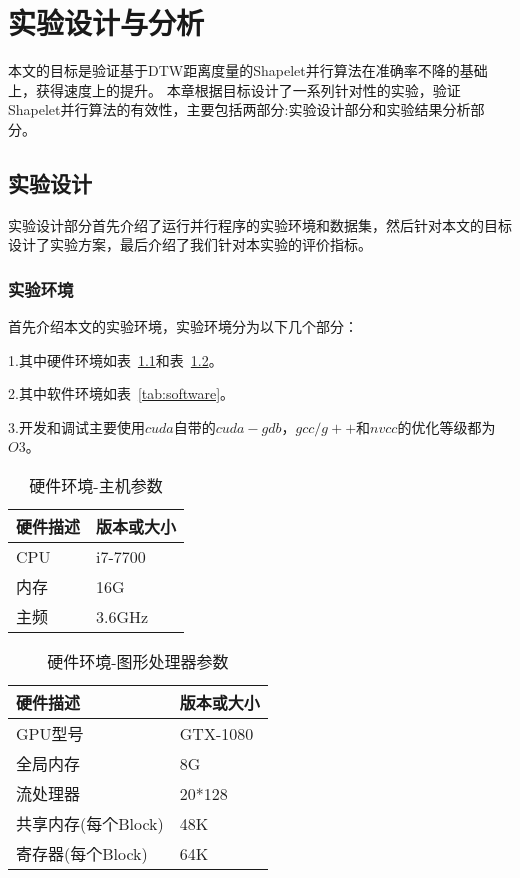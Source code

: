 \chapter{实验设计与分析}
\label{cha:expriment}

本文的目标是验证基于DTW距离度量的Shapelet并行算法在准确率不降的基础上，获得速度上的提升。
本章根据目标设计了一系列针对性的实验，验证Shapelet并行算法的有效性，主要包括两部分:实验设计部分和实验结果分析部分。

\section{实验设计}

实验设计部分首先介绍了运行并行程序的实验环境和数据集，然后针对本文的目标设计了实验方案，最后介绍了我们针对本实验的评价指标。
\subsection{实验环境}
首先介绍本文的实验环境，实验环境分为以下几个部分：

1.其中硬件环境如表~\ref{tab:computerversion}和表~\ref{tab:gpuversion}。

2.其中软件环境如表~\ref{tab:software}。

3.开发和调试主要使用$cuda$自带的$cuda-gdb$，$gcc/g++$和$nvcc$的优化等级都为$O3$。

\begin{table}[htb]
	\centering
	\begin{minipage}{0.5\textwidth}
		\centering
		\caption{硬件环境-主机参数}
		\label{tab:computerversion}
		\begin{tabular}{p{4cm}p{2cm}}
			\toprule[1.5pt]
			硬件描述 & 版本或大小 \\
			\midrule[1pt]
			CPU & i7-7700 \\
			内存 & 16G  \\
			主频 & 3.6GHz  \\
			\bottomrule[1.5pt]
		\end{tabular}
	\end{minipage}%
\end{table}

\begin{table}[htb]
	\centering
	\begin{minipage}{0.5\textwidth}
	\centering
	\caption{硬件环境-图形处理器参数}
	\label{tab:gpuversion}
		\begin{tabular}{p{4cm}p{2cm}}
			\toprule[1.5pt]
			硬件描述 & 版本或大小 \\
			\midrule[1pt]
			GPU型号 & GTX-1080 \\
			全局内存 & 8G \\
			流处理器 & 20*128 \\
			共享内存(每个Block) & 48K \\
			寄存器(每个Block) & 64K \\
			\bottomrule[1.5pt]
		\end{tabular}
	\end{minipage}
\end{table}

